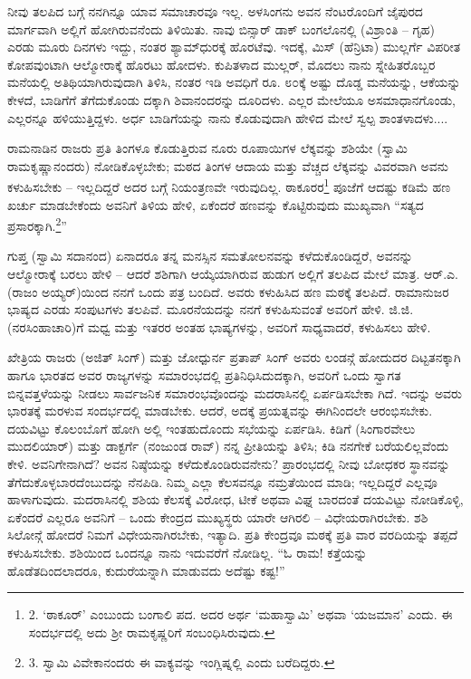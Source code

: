 ನೀವು ತಲಪಿದ ಬಗ್ಗೆ ನನಗಿನ್ನೂ ಯಾವ ಸಮಾಚಾರವೂ ಇಲ್ಲ. ಅಳಸಿಂಗನು ಅವನ ನೆಂಟರೊಂದಿಗೆ ಜೈಪುರದ ಮಾರ್ಗವಾಗಿ ಅಲ್ಲಿಗೆ ಹೋಗಿರುವನೆಂದು ತಿಳಿಯಿತು. ನಾವು ಬಿನ್ಸಾರ್ ಡಾಕ್ ಬಂಗಲೊನಲ್ಲಿ (ವಿಶ್ರಾಂತಿ – ಗೃಹ) ಎರಡು ಮೂರು ದಿನಗಳು ಇದ್ದು, ನಂತರ ಶ್ಯಾಮ್​ಧುರಕ್ಕೆ ಹೊರಟೆವು. ಇದಕ್ಕೆ, ಮಿಸ್ (ಹೆನ್ರಿಟಾ) ಮುಲ್ಲರ್ಗೆ ವಿಪರೀತ ಕೋಪವುಂಟಾಗಿ ಆಲ್ಮೋರಾಕ್ಕೆ ಹೊರಟು ಹೋದಳು. ಕುಪಿತಳಾದ ಮುಲ್ಲರ್, ಮೊದಲು ನಾನು ಸ್ನೇಹಿತರೊಬ್ಬರ ಮನೆಯಲ್ಲಿ ಅತಿಥಿಯಾಗಿರುವುದಾಗಿ ತಿಳಿಸಿ, ನಂತರ ಇಡಿ ಅವಧಿಗೆ ರೂ. ೮೦ಕ್ಕೆ ಅಷ್ಟು ದೊಡ್ಡ ಮನೆಯನ್ನು, ಆಕೆಯನ್ನು ಕೇಳದೆ, ಬಾಡಿಗೆಗೆ ತೆಗೆದುಕೊಂಡು ದಕ್ಕಾಗಿ ಶಿವಾನಂದರನ್ನು ದೂರಿದಳು. ಎಲ್ಲರ ಮೇಲೆಯೂ ಅಸಮಾಧಾನಗೊಂಡು, ಎಲ್ಲರನ್ನೂ ಹಳಿಯುತ್ತಿದ್ದಳು. ಅರ್ಧ ಬಾಡಿಗೆಯನ್ನು ನಾನು ಕೊಡುವುದಾಗಿ ಹೇಳಿದ ಮೇಲೆ ಸ್ವಲ್ಪ ಶಾಂತಳಾದಳು....

ರಾಮನಾಡಿನ ರಾಜರು ಪ್ರತಿ ತಿಂಗಳೂ ಕೊಡುತ್ತಿರುವ ನೂರು ರೂಪಾಯಿಗಳ ಲೆಕ್ಕವನ್ನು ಶಶಿಯೇ (ಸ್ವಾಮಿ ರಾಮಕೃಷ್ಣಾನಂದರು) ನೋಡಿಕೊಳ್ಳಬೇಕು; ಮಠದ ತಿಂಗಳ ಆದಾಯ ಮತ್ತು ವೆಚ್ಚದ ಲೆಕ್ಕವನ್ನು ವಿವರವಾಗಿ ಅವನು ಕಳುಹಿಸಬೇಕು – ಇಲ್ಲದಿದ್ದರೆ ಅದರ ಬಗ್ಗೆ ನಿಯಂತ್ರಣವೇ ಇರುವುದಿಲ್ಲ. ಠಾಕೂರರ\footnote{2. ‘ಠಾಕೂರ್’ ಎಂಬುಂದು ಬಂಗಾಲಿ ಪದ. ಅದರ ಅರ್ಥ ‘ಮಹಾಸ್ವಾಮಿ’ ಅಥವಾ ‘ಯಜಮಾನ’ ಎಂದು. ಈ ಸಂದರ್ಭದಲ್ಲಿ ಅದು ಶ‍್ರೀ ರಾಮಕೃಷ್ಣರಿಗೆ ಸಂಬಂಧಿಸಿರುವುದು.} ಪೂಜೆಗೆ ಆದಷ್ಟು ಕಡಿಮೆ ಹಣ ಖರ್ಚು ಮಾಡಬೇಕೆಂದು ಅವನಿಗೆ ತಿಳಿಯ ಹೇಳಿ, ಏಕೆಂದರೆ ಹಣವನ್ನು ಕೊಟ್ಟಿರುವುದು ಮುಖ್ಯವಾಗಿ “ಸತ್ಯದ ಪ್ರಸಾರಕ್ಕಾಗಿ.\footnote{3. ಸ್ವಾಮಿ ವಿವೇಕಾನಂದರು ಈ ವಾಕ್ಯವನ್ನು ಇಂಗ್ಲಿಷ್ನಲ್ಲಿ  ಎಂದು ಬರೆದಿದ್ದರು.}”

ಗುಪ್ತ (ಸ್ವಾಮಿ ಸದಾನಂದ) ಏನಾದರೂ ತನ್ನ ಮನಸ್ಸಿನ ಸಮತೋಲನವನ್ನು ಕಳೆದುಕೊಂಡಿದ್ದರೆ, ಅವನನ್ನು ಆಲ್ಮೋರಾಕ್ಕೆ ಬರಲು ಹೇಳಿ – ಆದರೆ ಶಶಿಗಾಗಿ ಆಯ್ಕೆಯಾಗಿರುವ ಹುಡುಗ ಅಲ್ಲಿಗೆ ತಲಪಿದ ಮೇಲೆ ಮಾತ್ರ. ಆರ್.ಎ. (ರಾಜಂ ಅಯ್ಯರ್)ಯಿಂದ ನನಗೆ ಒಂದು ಪತ್ರ ಬಂದಿದೆ. ಅವರು ಕಳುಹಿಸಿದ ಹಣ ಮಠಕ್ಕೆ ತಲಪಿದೆ. ರಾಮಾನುಜರ ಭಾಷ್ಯದ ಎರಡು ಸಂಪುಟಗಳು ತಲಪಿವೆ. ಮೂರನೆಯದನ್ನು ನನಗೆ ಕಳುಹಿಸುವಂತೆ ಅವರಿಗೆ ಹೇಳಿ. ಜಿ.ಜಿ. (ನರಸಿಂಹಾಚಾರಿ)ಗೆ ಮಧ್ವ ಮತ್ತು ಇತರರ ಅಂತಹ ಭಾಷ್ಯಗಳನ್ನು, ಅವರಿಗೆ ಸಾಧ್ಯವಾದರೆ, ಕಳುಹಿಸಲು ಹೇಳಿ.

ಖೇತ್ರಿಯ ರಾಜರು (ಅಜಿತ್ ಸಿಂಗ್) ಮತ್ತು ಜೋಧ್ಪುರ್ನ ಪ್ರತಾಪ್ ಸಿಂಗ್ ಅವರು ಲಂಡನ್ಗೆ ಹೋದುದರ ದಿಟ್ಟತನಕ್ಕಾಗಿ ಹಾಗೂ ಭಾರತದ ಅವರ ರಾಜ್ಯಗಳನ್ನು ಸಮಾರಂಭದಲ್ಲಿ ಪ್ರತಿನಿಧಿಸಿದುದಕ್ಕಾಗಿ, ಅವರಿಗೆ ಒಂದು ಸ್ವಾಗತ ಬಿನ್ನವತ್ತಳೆಯನ್ನು ನೀಡಲು ಸಾರ್ವಜನಿಕ ಸಮಾರಂಭವೊಂದನ್ನು ಮದರಾಸಿನಲ್ಲಿ ಏರ್ಪಡಿಸಬೇಕಾ ಗಿದೆ. ಇದನ್ನು ಅವರು ಭಾರತಕ್ಕೆ ಮರಳುವ ಸಂದರ್ಭದಲ್ಲಿ ಮಾಡಬೇಕು. ಆದರೆ, ಅದಕ್ಕೆ ಪ್ರಯತ್ನವನ್ನು ಈಗಿನಿಂದಲೇ ಆರಂಭಿಸಬೇಕು. ದಯವಿಟ್ಟು ಕೊಲಂಬೊಗೆ ಹೋಗಿ ಅಲ್ಲಿ ಇಂತಹುದೊಂದು ಸಭೆಯನ್ನು ಏರ್ಪಡಿಸಿ. ಕಿಡಿಗೆ (ಸಿಂಗಾರವೇಲು ಮುದಲಿಯಾರ್) ಮತ್ತು ಡಾಕ್ಟರ್ಗೆ (ನಂಜುಂಡ ರಾವ್) ನನ್ನ ಪ್ರೀತಿಯನ್ನು ತಿಳಿಸಿ; ಕಿಡಿ ನನಗೇಕೆ ಬರೆಯಲಿಲ್ಲವೆಂದು ಕೇಳಿ. ಅವನಿಗೇನಾಗಿದೆ? ಅವನ ನಿಷ್ಠೆಯನ್ನು ಕಳೆದುಕೊಂಡಿರುವನೇನು? ಪ್ರಾರಂಭದಲ್ಲಿ ನೀವು ಬೋಧಕರ ಸ್ಥಾನವನ್ನು ತೆಗೆದುಕೊಳ್ಳಬಾರದೆಂಬುದನ್ನು ನೆನಪಿಡಿ. ನಿಮ್ಮ ಎಲ್ಲಾ ಕೆಲಸವನ್ನೂ ನಮ್ರತೆಯಿಂದ ಮಾಡಿ; ಇಲ್ಲದಿದ್ದರೆ ಎಲ್ಲವೂ ಹಾಳಾಗುವುದು. ಮದರಾಸಿನಲ್ಲಿ ಶಶಿಯ ಕೆಲಸಕ್ಕೆ ವಿರೋಧ, ಟೀಕೆ ಅಥವಾ ವಿಘ್ನ ಬಾರದಂತೆ ದಯವಿಟ್ಟು ನೋಡಿಕೊಳ್ಳಿ, ಏಕೆಂದರೆ ಎಲ್ಲರೂ ಅವನಿಗೆ – ಒಂದು ಕೇಂದ್ರದ ಮುಖ್ಯಸ್ಥರು ಯಾರೇ ಆಗಿರಲಿ – ವಿಧೇಯರಾಗಿರಬೇಕು. ಶಶಿ ಸಿಲೋನ್ಗೆ ಹೋದರೆ ನಿಮಗೆ ವಿಧೇಯನಾಗಿರಬೇಕು, ಇತ್ಯಾದಿ. ಪ್ರತಿ ಕೇಂದ್ರವೂ ಮಠಕ್ಕೆ ಪ್ರತಿ ವಾರ ವರದಿಯನ್ನು ತಪ್ಪದೆ ಕಳುಹಿಸಬೇಕು. ಶಶಿಯಿಂದ ಒಂದನ್ನೂ ನಾನು ಇದುವರೆಗೆ ನೋಡಿಲ್ಲ. “ಓ ರಾಮ! ಕತ್ತೆಯನ್ನು ಹೊಡೆತದಿಂದಲಾದರೂ, ಕುದುರೆಯನ್ನಾಗಿ ಮಾಡುವದು ಅದೆಷ್ಟು ಕಷ್ಟ!”

